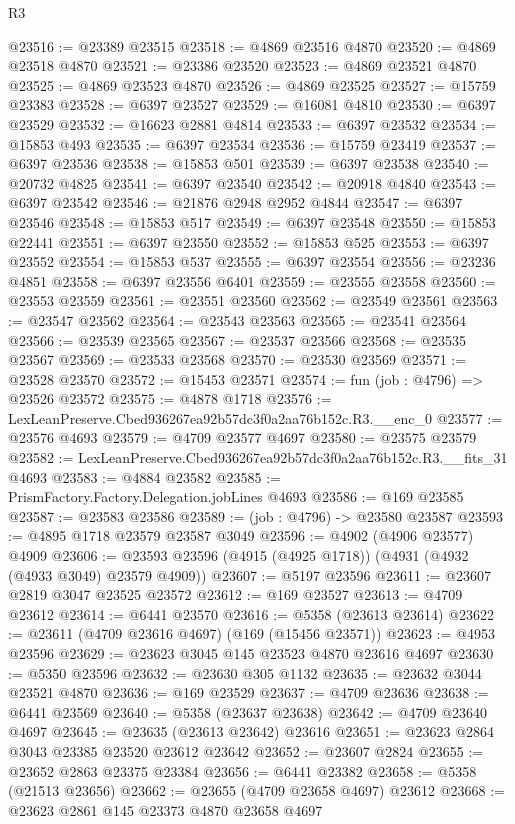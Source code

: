 \begin{lexlean}{R3}
\begin{coremodule}
@23516 := @23389 @23515
@23518 := @4869 @23516 @4870
@23520 := @4869 @23518 @4870
@23521 := @23386 @23520
@23523 := @4869 @23521 @4870
@23525 := @4869 @23523 @4870
@23526 := @4869 @23525
@23527 := @15759 @23383
@23528 := @6397 @23527
@23529 := @16081 @4810
@23530 := @6397 @23529
@23532 := @16623 @2881 @4814
@23533 := @6397 @23532
@23534 := @15853 @493
@23535 := @6397 @23534
@23536 := @15759 @23419
@23537 := @6397 @23536
@23538 := @15853 @501
@23539 := @6397 @23538
@23540 := @20732 @4825
@23541 := @6397 @23540
@23542 := @20918 @4840
@23543 := @6397 @23542
@23546 := @21876 @2948 @2952 @4844
@23547 := @6397 @23546
@23548 := @15853 @517
@23549 := @6397 @23548
@23550 := @15853 @22441
@23551 := @6397 @23550
@23552 := @15853 @525
@23553 := @6397 @23552
@23554 := @15853 @537
@23555 := @6397 @23554
@23556 := @23236 @4851
@23558 := @6397 @23556 @6401
@23559 := @23555 @23558
@23560 := @23553 @23559
@23561 := @23551 @23560
@23562 := @23549 @23561
@23563 := @23547 @23562
@23564 := @23543 @23563
@23565 := @23541 @23564
@23566 := @23539 @23565
@23567 := @23537 @23566
@23568 := @23535 @23567
@23569 := @23533 @23568
@23570 := @23530 @23569
@23571 := @23528 @23570
@23572 := @15453 @23571
@23574 := fun (job : @4796) => @23526 @23572
@23575 := @4878 @1718
@23576 := LexLeanPreserve.Cbed936267ea92b57dc3f0a2aa76b152c.R3.__enc_0
@23577 := @23576 @4693
@23579 := @4709 @23577 @4697
@23580 := @23575 @23579
@23582 := LexLeanPreserve.Cbed936267ea92b57dc3f0a2aa76b152c.R3.__fits_31 @4693
@23583 := @4884 @23582
@23585 := PrismFactory.Factory.Delegation.jobLines @4693
@23586 := @169 @23585
@23587 := @23583 @23586
@23589 := (job : @4796) -> @23580 @23587
@23593 := @4895 @1718 @23579 @23587 @3049
@23596 := @4902 (@4906 @23577) @4909
@23606 := @23593 @23596 (@4915 (@4925 @1718)) (@4931 (@4932 (@4933 @3049) @23579 @4909))
@23607 := @5197 @23596
@23611 := @23607 @2819 @3047 @23525 @23572
@23612 := @169 @23527
@23613 := @4709 @23612
@23614 := @6441 @23570
@23616 := @5358 (@23613 @23614)
@23622 := @23611 (@4709 @23616 @4697) (@169 (@15456 @23571))
@23623 := @4953 @23596
@23629 := @23623 @3045 @145 @23523 @4870 @23616 @4697
@23630 := @5350 @23596
@23632 := @23630 @305 @1132
@23635 := @23632 @3044 @23521 @4870
@23636 := @169 @23529
@23637 := @4709 @23636
@23638 := @6441 @23569
@23640 := @5358 (@23637 @23638)
@23642 := @4709 @23640 @4697
@23645 := @23635 (@23613 @23642) @23616
@23651 := @23623 @2864 @3043 @23385 @23520 @23612 @23642
@23652 := @23607 @2824
@23655 := @23652 @2863 @23375 @23384
@23656 := @6441 @23382
@23658 := @5358 (@21513 @23656)
@23662 := @23655 (@4709 @23658 @4697) @23612
@23668 := @23623 @2861 @145 @23373 @4870 @23658 @4697

\end{coremodule}
\end{lexlean}
